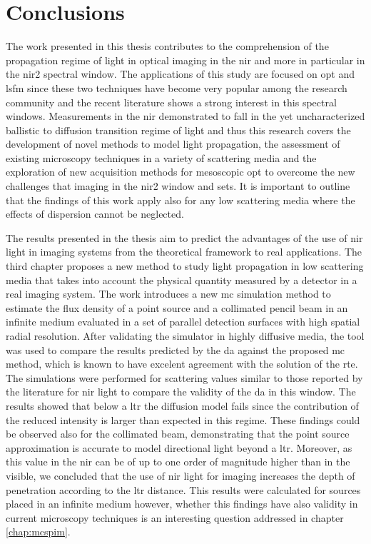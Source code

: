 \chapter*{Conclusions}


The work presented in this thesis contributes to the comprehension of the propagation regime of light in optical imaging in the \gls{nir} and more in particular in the \gls{nir2} spectral window. The applications of this study are focused on \gls{opt} and \gls{lsfm} since these two techniques have become very popular among the research community and the recent literature shows a strong interest in this spectral windows. Measurements in the \gls{nir} demonstrated to fall in the yet uncharacterized ballistic to diffusion transition regime of light and thus this research covers the development of novel methods to model light propagation, the assessment of existing microscopy techniques in a variety of scattering media and the exploration of new acquisition methods for mesoscopic \gls{opt} to overcome the new challenges that imaging in the \gls{nir2} window and sets. It is important to outline that the findings of this work apply also for any low scattering media where the effects of dispersion cannot be neglected.

The results presented in the thesis aim to predict the advantages of the use of \gls{nir} light in imaging systems from the theoretical framework to real applications. The third chapter proposes a new method to study light propagation in low scattering media that takes into account the physical quantity measured by a detector in a real imaging system. The work introduces a new \gls{mc} simulation method to estimate the flux density of a point source and a collimated pencil beam in an infinite medium evaluated in a set of parallel detection surfaces with high spatial radial resolution. After validating the simulator in highly diffusive media, the tool was used to compare the results predicted by the \gls{da} against the proposed \gls{mc} method, which is known to have excelent agreement with the solution of the \gls{rte}. The simulations were performed for scattering values similar to those reported by the literature for \gls{nir} light to compare the validity of the \gls{da} in this window. The results showed that below a \gls{ltr} the diffusion model fails since the contribution of the reduced intensity is larger than expected in this regime. These findings could be observed also for the collimated beam, demonstrating that the point source approximation is accurate to model directional light beyond a \gls{ltr}. Moreover, as this value in the \gls{nir} can be of up to one order of magnitude higher than in the visible, we concluded that the use of \gls{nir} light for imaging increases the depth of penetration according to the \gls{ltr} distance. This results were calculated for sources placed in an infinite medium however, whether this findings have also validity in current microscopy techniques is an interesting question addressed in chapter \ref{chap:mcspim}.

